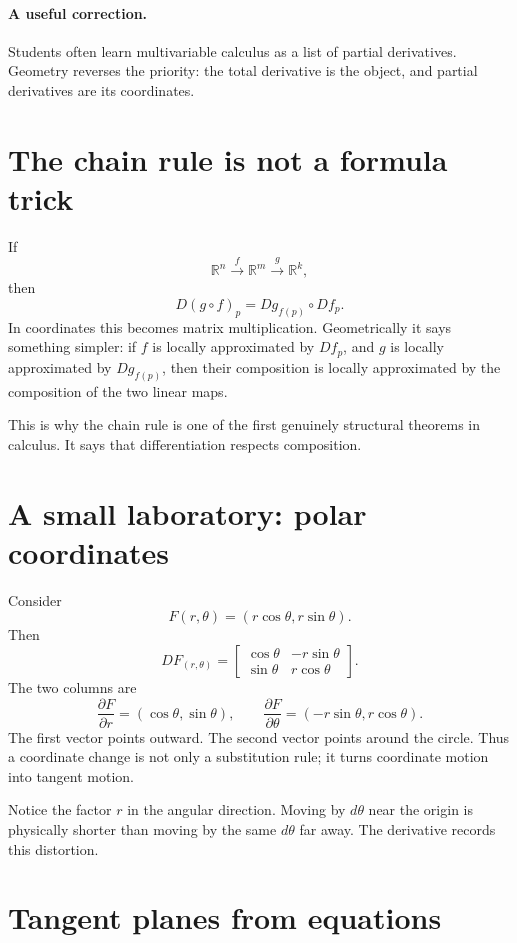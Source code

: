 \paragraph{A useful correction.}
Students often learn multivariable calculus as a list of partial derivatives. Geometry reverses the priority: the total derivative is the object, and partial derivatives are its coordinates.

\section{The chain rule is not a formula trick}

If
\[
  \mathbb R^n\xrightarrow{f}\mathbb R^m\xrightarrow{g}\mathbb R^k,
\]
then
\[
  D(g\circ f)_p=Dg_{f(p)}\circ Df_p.
\]
In coordinates this becomes matrix multiplication. Geometrically it says something simpler: if \(f\) is locally approximated by \(Df_p\), and \(g\) is locally approximated by \(Dg_{f(p)}\), then their composition is locally approximated by the composition of the two linear maps.

This is why the chain rule is one of the first genuinely structural theorems in calculus. It says that differentiation respects composition.

\section{A small laboratory: polar coordinates}

Consider
\[
  F(r,\theta)=(r\cos\theta,r\sin\theta).
\]
Then
\[
  DF_{(r,\theta)}=
  \begin{bmatrix}
  \cos\theta&-r\sin\theta\\
  \sin\theta&r\cos\theta
  \end{bmatrix}.
\]
The two columns are
\[
  \frac{\partial F}{\partial r}=(\cos\theta,\sin\theta),
  \qquad
  \frac{\partial F}{\partial\theta}=(-r\sin\theta,r\cos\theta).
\]
The first vector points outward. The second vector points around the circle. Thus a coordinate change is not only a substitution rule; it turns coordinate motion into tangent motion.

Notice the factor \(r\) in the angular direction. Moving by \(d\theta\) near the origin is physically shorter than moving by the same \(d\theta\) far away. The derivative records this distortion.

\section{Tangent planes from equations}


